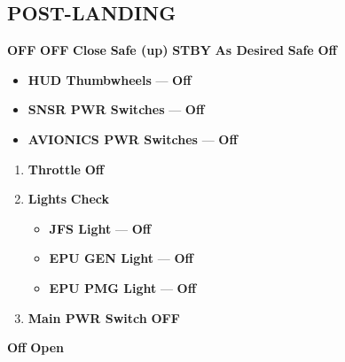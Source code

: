 \subsection{POST-LANDING}
\begin{checklistenumerate}
    \dotfill\textbf{OFF}
    \dotfill\textbf{OFF}
    \blueitem[Speedbrakes]\dotfill\textbf{Close}
    \dotfill\textbf{Safe (up)}
    \dotfill\textbf{STBY}
    \dotfill\textbf{As Desired}
    \dotfill\textbf{Safe}
    \blueitem[Avionics]\dotfill\textbf{Off}
    \begin{itemize}
        \item \textbf{HUD Thumbwheels} --- \textbf{Off}
        \item \textbf{SNSR PWR Switches} --- \textbf{Off}
        \item \textbf{AVIONICS PWR Switches} --- \textbf{Off}
    \end{itemize}
    \begin{enumerate}
        \item \textbf{Throttle} \dotfill \textbf{Off}
        \item \textbf{Lights} \dotfill \textbf{Check}
        \begin{itemize}
            \item \textbf{JFS Light} --- \textbf{Off}
            \item \textbf{EPU GEN Light} --- \textbf{Off}
            \item \textbf{EPU PMG Light} --- \textbf{Off}
        \end{itemize}
        \item \textbf{Main PWR Switch} \dotfill \textbf{OFF}
    \end{enumerate}
    \dotfill\textbf{Off}
    \blueitem[Canopy]\dotfill\textbf{Open}
\end{checklistenumerate}

\marginfigrestore